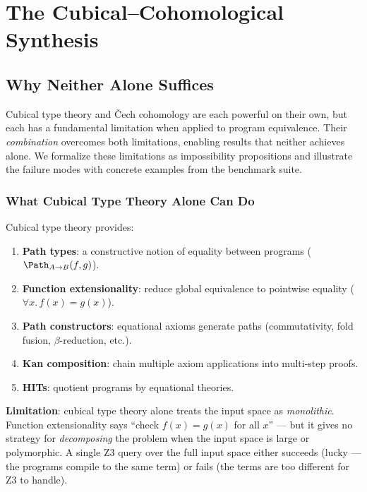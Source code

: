 \part{The Cubical--Cohomological Synthesis}

\chapter{Why Neither Alone Suffices}
\label{ch:neither-alone}

Cubical type theory and \v{C}ech cohomology are each powerful on their
own, but each has a fundamental limitation when applied to program
equivalence.  Their \emph{combination} overcomes both limitations,
enabling results that neither achieves alone.  We formalize these
limitations as impossibility propositions and illustrate the failure
modes with concrete examples from the benchmark suite.

\section{What Cubical Type Theory Alone Can Do}

Cubical type theory provides:
\begin{enumerate}
  \item \textbf{Path types}: a constructive notion of equality between
    programs ($\Path_{A \to B}(f, g)$).
  \item \textbf{Function extensionality}: reduce global equivalence to
    pointwise equality ($\forall x.\, f(x) = g(x)$).
  \item \textbf{Path constructors}: equational axioms generate paths
    (commutativity, fold fusion, $\beta$-reduction, etc.).
  \item \textbf{Kan composition}: chain multiple axiom applications
    into multi-step proofs.
  \item \textbf{HITs}: quotient programs by equational theories.
\end{enumerate}

\textbf{Limitation}: cubical type theory alone treats the input space
as \emph{monolithic}.  Function extensionality says ``check $f(x) =
g(x)$ for all $x$'' --- but it gives no strategy for \emph{decomposing}
the problem when the input space is large or polymorphic.  A single
Z3 query over the full input space either succeeds (lucky --- the
programs compile to the same term) or fails (the terms are too
different for Z3 to handle).

